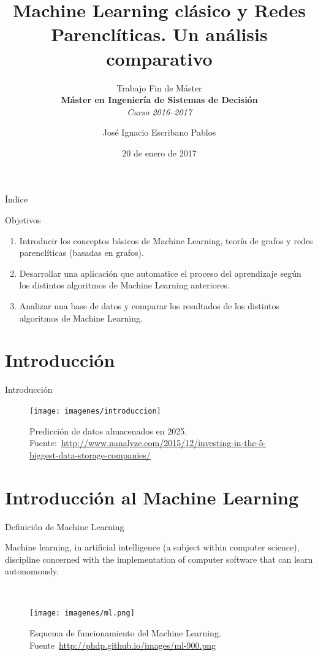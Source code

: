\documentclass[hyperref={unicode}]{beamer}
\title{Machine Learning clásico y Redes Parenclíticas. Un análisis comparativo}
\subtitle{Trabajo Fin de Máster \\ \textbf{Máster en Ingeniería de Sistemas de Decisión} \\ \textit{Curso 2016--2017}}
\author{José Ignacio Escribano Pablos}
\institute{\begin{tabular}{c}
Ana Elizabeth García Sipols \\
Miguel Romance del Río     
\end{tabular}}
\date{20 de enero de 2017}
\begin{document}
\setcounter{showProgressBar}{0}
\setcounter{showSlideNumbers}{0}

\frame{\titlepage}

\begin{frame}{Índice}
	\tableofcontents
\end{frame}

\setcounter{framenumber}{0}
\setcounter{showProgressBar}{1}
\setcounter{showSlideNumbers}{1}

\begin{frame}{Objetivos}
	\begin{enumerate}
		\item Introducir los conceptos básicos de Machine Learning, teoría de grafos y redes parenclíticas (basadas en grafos).
		
		\item Desarrollar una aplicación que automatice el proceso del aprendizaje según los distintos algoritmos de Machine Learning anteriores.
		
		\item Analizar una base de datos y comparar los resultados de los distintos algoritmos de Machine Learning.
	\end{enumerate}
\end{frame}

\section{Introducción}
\begin{frame}{Introducción}
	\begin{figure}
			\begin{center}
			\texttt{[image: imagenes/introduccion]}
			\caption{Predicción de datos almacenados en 2025. Fuente:~\url{http://www.nanalyze.com/2015/12/investing-in-the-5-biggest-data-storage-companies/}}
			\end{center}
		\end{figure}
\end{frame}

\section{Introducción al Machine Learning}
\begin{frame}{Definición de Machine Learning}
	\begin{fancyquotes}
		Machine learning, in artificial intelligence (a subject within computer science), discipline concerned with the implementation of computer software that can learn autonomously.
	\end{fancyquotes}

	\ \\

	\begin{figure}
		\begin{center}
			\texttt{[image: imagenes/ml.png]}
			\caption{Esquema de funcionamiento del Machine Learning. Fuente~\url{http://phdp.github.io/images/ml-900.png}}
		\end{center}
	\end{figure}
\end{frame}
\end{document}
